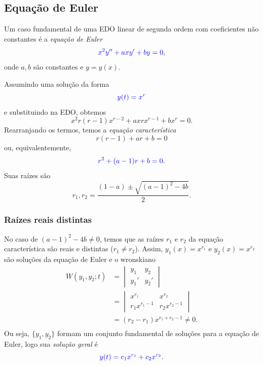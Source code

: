 \subsection{Equação de Euler}

Um caso fundamental de uma EDO linear de segunda ordem com coeficientes não constantes é a \emph{equação de Euler}
\begin{equation}
  {\color{blue}x^2y'' + axy' + by = 0},
\end{equation}
onde $a,b$ são constantes e $y = y(x)$.

Assumindo uma solução da forma
\begin{equation}
  {\color{blue}y(t) = x^r}
\end{equation}
e substituindo na EDO, obtemos
\begin{equation}
  x^2r(r-1)x^{r-2} + axrx^{r-1} + bx^r = 0.
\end{equation}
Rearranjando os termos, temos a \emph{equação característica}
\begin{equation}
  r(r-1) + ar + b = 0
\end{equation}
ou, equivalentemente,
\begin{equation}
  {\color{blue}r^2 + (a-1)r + b = 0}.
\end{equation}
Suas raízes são
\begin{equation}
  r_1, r_2 = \frac{(1-a)\pm\sqrt{(a-1)^2-4b}}{2}.
\end{equation}

\subsubsection{Raízes reais distintas}

No caso de $(a-1)^2-4b\neq 0$, temos que as raízes $r_1$ e $r_2$ da equação característica são reais e distintas ($r_1\neq r_2$). Assim, $y_1(x) = x^{r_1} $ e $y_2(x) = x^{r_2}$ são soluções da equação de Euler e o wronskiano
\begin{align}
  W(y_1,y_2;t) &=
                 \begin{vmatrix}
                   y_1 & y_2 \\
                   y_1' & y_2'
                 \end{vmatrix} \\
               &=
                 \begin{vmatrix}
                   x^{r_1} & x^{r_2} \\
                   r_1x^{r_1-1} & r_2x^{r_2-1}
                 \end{vmatrix} \\
               &= (r_2-r_1)x^{r_1+r_2-1} \neq 0.\\
\end{align}
Ou seja, $\{y_1,y_2\}$ formam um conjunto fundamental de soluções para a equação de Euler, logo sua \emph{solução geral} é
\begin{equation}
  {\color{blue}y(t) = c_1x^{r_1} + c_2x^{r_2}}.
\end{equation}

